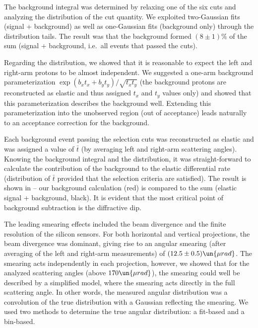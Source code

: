 The background integral was determined by relaxing one of the six cuts and analyzing the distribution of the cut quantity. We exploited two-Gaussian fits (signal + background) as well as one-Gaussian fits (background only) through the distribution tails. The result was that the background formed $(8\pm 1)\percent$ of the sum (signal + background, i.e.~all events that passed the cuts).

Regarding the distribution, we showed that it is reasonable to expect the left and right-arm protons to be almost independent. We suggested a one-arm background parameterization $\exp(b_x t_x + b_y t_y) / \sqrt{t_x t_y}$ (the background protons are reconstructed as elastic and thus assigned $t_x$ and $t_y$ values only) and showed that this parameterization describes the background well. Extending this parameterization into the unobserved region (out of acceptance) leads naturally to an acceptance correction for the background.

Each background event passing the selection cuts was reconstructed as elastic and was assigned a value of $\bar t$ (by averaging left and right-arm scattering angles). Knowing the background integral and the distribution, it was straight-forward to calculate the contribution of the background to the elastic differential rate (distribution of $\bar t$ provided that the selection criteria are satisfied). The result is shown in  -- our background calculation (red) is compared to the sum (elastic signal + background, black). It is evident that the most critical point of background subtraction is the diffractive dip.


\bmfig
{}
%
\emfig

The leading smearing effects included the beam divergence and the finite resolution of the silicon sensors. For both horizontal and vertical projections, the beam divergence was dominant, giving rise to an angular smearing (after averaging of the left and right-arm measurements) of $(12.5 \pm 0.5)\un{\mu rad}$. The smearing acts independently in each projection, however, we showed that for the analyzed scattering angles (above $170\un{\mu rad}$), the smearing could well be described by a simplified model, where the smearing acts directly in the full scattering angle. In other words, the measured angular distribution was a convolution of the true distribution with a Gaussian reflecting the smearing. We used two methods to determine the true angular distribution: a fit-based and a bin-based.

